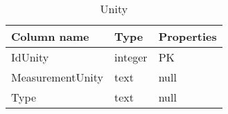 \begin{table}[H] 
\caption{Unity}
\centering
\begin{tabular}{| p{4cm} | p{3cm} | p{3cm}|}
\hline
\textbf{Column name} & \textbf{Type} & \textbf{Properties}  \\ \hline
IdUnity & integer & PK  \\ \hline
MeasurementUnity & text & null  \\ \hline
Type & text & null  \\ \hline
\end{tabular}
\end{table}